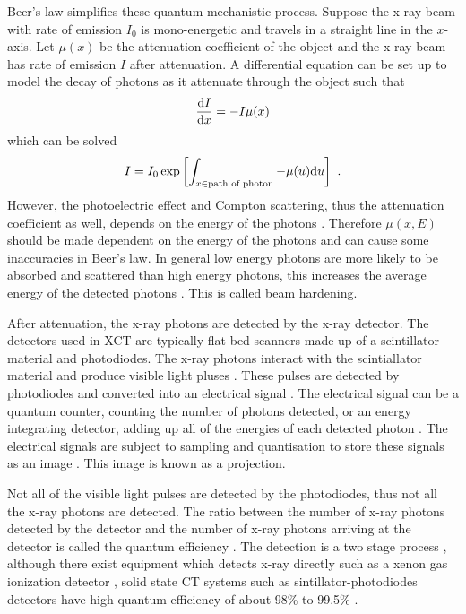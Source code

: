 Beer's law simplifies these quantum mechanistic process. Suppose the x-ray beam with rate of emission $I_0$ is mono-energetic and travels in a straight line in the $x$-axis. Let $\mu(x)$ be the attenuation coefficient of the object and the x-ray beam has rate of emission $I$ after attenuation. A differential equation can be set up to model the decay of photons as it attenuate through the object such that
\begin{equation}
\dfrac{\mathrm{d} I}{\mathrm{d} x} = -I\mu(x)
\end{equation}
which can be solved
\begin{equation}
I = I_0\exp\left[\int_{x \in \text{path of photon}}-\mu(u)\mathrm{d} u\right] \ .
\label{eq:beerLaw}
\end{equation}
However, the photoelectric effect and Compton scattering, thus the attenuation coefficient as well, depends on the energy of the photons \citep{elbakri2002statistical}. Therefore $\mu(x,E)$ should be made dependent on the energy of the photons \citep{cantatore2011introduction} and can cause some inaccuracies in Beer's law. In general low energy photons are more likely to be absorbed and scattered than high energy photons, this increases the average energy of the detected photons \citep{sun2012overview}. This is called beam hardening.

After attenuation, the x-ray photons are detected by the x-ray detector. The detectors used in XCT are typically flat bed scanners made up of a scintillator material \citep{curran1953luminescence, greskovich1997ceramic} and photodiodes. The x-ray photons interact with the scintiallator material and produce visible light pluses \citep{rossner1993conversion}. These pulses are detected by photodiodes and converted into an electrical signal \citep{nikl2006scintillation, ren2018tutorial}. The electrical signal can be a quantum counter, counting the number of photons detected, or an energy integrating detector, adding up all of the energies of each detected photon \citep{nikl2006scintillation, whiting2006properties, kruth2011computed, ren2018tutorial}. The electrical signals are subject to sampling and quantisation to store these signals as an image \citep{cierniak2011x}. This image is known as a projection.

Not all of the visible light pulses are detected by the photodiodes, thus not all the x-ray photons are detected. The ratio between the number of x-ray photons detected by the detector and the number of x-ray photons arriving at the detector is called the quantum efficiency \citep{cierniak2011x, ren2018tutorial}. The detection is a two stage process \citep{cierniak2011x}, although there exist equipment which detects x-ray directly such as a xenon gas ionization detector \citep{fuchs2000direct}, solid state CT systems such as sintillator-photodiodes detectors have high quantum efficiency of about 98\% to 99.5\% \citep{hsieh2000investigation}.

